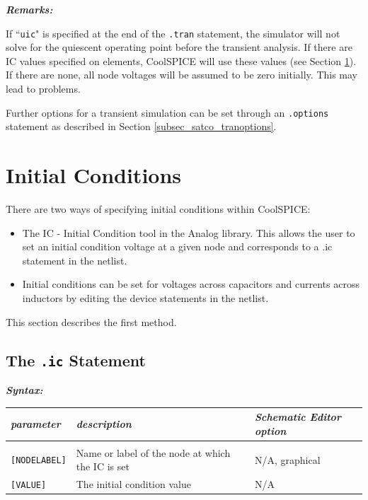 \textbf{\textit{Remarks:}}

If ``\texttt{uic}" is specified at the end of the \texttt{.tran} statement, the simulator will not solve for the quiescent operating point before the transient analysis. If there are IC values specified on elements, CoolSPICE will use these values (see Section \ref{sec_satco_initialconditions}).  If there are none, all node voltages will be assumed to be zero initially.  This may lead to problems.

Further options for a transient simulation can be set through an \texttt{.options} statement as described in Section \ref{subsec_satco_tranoptions}.

\section{Initial Conditions}
\label{sec_satco_initialconditions}

There are two ways of specifying initial conditions within CoolSPICE:

\begin{itemize}
\item  The \textsf{IC - Initial Condition} tool in the \textsf{Analog} library.  This allows the user to set an initial condition voltage at a given node and corresponds to a \textsf{.ic} statement in the netlist.  
\item Initial conditions can be set for voltages across capacitors and currents across inductors by editing the device statements in the netlist.  
\end{itemize}

This section describes the first method.

\subsection{The \texttt{.ic} Statement}
\label{sec_satco_icstatement}

\textbf{\textit{Syntax:}}


\begin{tabular}{lp{5.5cm}p{5cm}}
\textit{parameter} & \textit{description} & \textit{Schematic Editor option}\\ \hline \\ \vspace{-0.8\parskip}
\texttt{[NODELABEL]} & Name or label of the node at which the IC is set & \textsf{N/A, graphical} \\
\texttt{[VALUE]} & The initial condition value & \textsf{N/A} 
\end{tabular}

